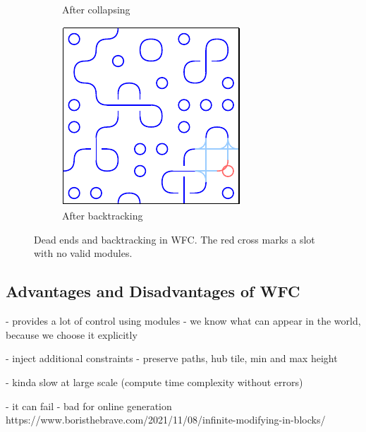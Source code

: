 \begin{figure}
\begin{subfigure}{0.31\textwidth}
        \caption{After collapsing} \label{fig:wfc-dead-end}
    \end{subfigure}%
    \hspace*{\fill}
    \begin{subfigure}{0.31\textwidth}
        \includegraphics[width=\linewidth]{img/WFC backtracking after.pdf}
        \caption{After backtracking} \label{fig:wfc-after-backtracking}
    \end{subfigure}

    \caption{Dead ends and backtracking in WFC. The red cross marks a slot with no valid modules.}\label{fig:wfc-backtracking}
\end{figure}

\subsection{Advantages and Disadvantages of WFC}

- provides a lot of control using modules - we know what can appear in the world, because we choose it explicitly

- inject additional constraints - preserve paths, hub tile, min and max height

- kinda slow at large scale (compute time complexity without errors)

- it can fail - bad for online generation https://www.boristhebrave.com/2021/11/08/infinite-modifying-in-blocks/

